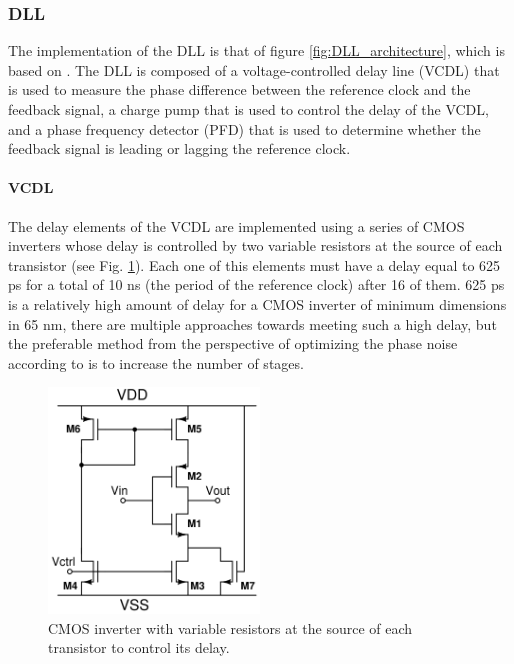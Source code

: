 \subsubsection{DLL}
The implementation of the DLL is that of figure \ref{fig:DLL_architecture}, which is based on \cite{Razavi_DLL_article}. The DLL is composed of a voltage-controlled delay line (VCDL) that is used
to measure the phase difference between the reference clock and the feedback signal, a charge pump that is used to control the delay of the VCDL, and a phase frequency detector (PFD) that is used to
determine whether the feedback signal is leading or lagging the reference clock.

\paragraph{VCDL}
The delay elements of the VCDL are implemented using a series of CMOS inverters whose delay is controlled by two variable resistors at the source of each transistor (see Fig. \ref{fig:VCDL_delay_elements}).
Each one of this elements must have a delay equal to 625 ps for a total of 10 ns (the period of the reference clock) after 16 of them. 625 ps is a relatively high amount of delay for a CMOS inverter of
minimum dimensions in 65 nm, there are multiple approaches towards meeting such a high delay, but the preferable method from the perspective of optimizing the phase noise according to \cite{Razavi_PLL_book}
is to increase the number of stages.

\begin{figure}[H]
    \centering
    \includegraphics[width=0.5\textwidth]{figures/VCDL_delay_elements.png}
    \caption{CMOS inverter with variable resistors at the source of each transistor to control its delay.}
    \label{fig:VCDL_delay_elements}
\end{figure}

